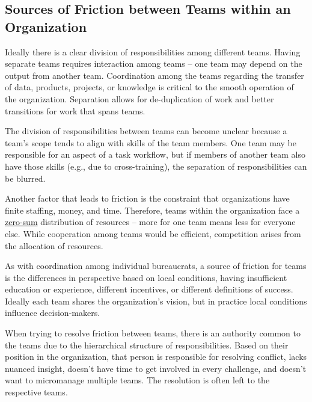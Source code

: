 \subsection*{Sources of Friction between Teams within an Organization}

Ideally there is a clear division of responsibilities among different teams. Having separate teams requires interaction among teams -- one team may depend on the output from another team. Coordination among the teams regarding the transfer of data, products, projects, or knowledge is critical to the smooth operation of the organization. Separation allows for de-duplication of work and better transitions for work that spans teams. 

The division of  responsibilities between teams can become unclear because a team's scope tends to align with skills of the team members. One team may be responsible for an aspect of a task workflow, but if members of another team also have those skills (e.g., due to cross-training), the separation of responsibilities can be blurred. 
 

Another factor that leads to friction is the constraint that organizations have finite staffing, money, and time. Therefore, teams within the organization face a \href{https://en.wikipedia.org/wiki/Zero-sum_game}{zero-sum}
distribution of resources -- more for one team means less for everyone else. While cooperation among teams would be efficient, competition arises from the allocation of resources.

As with coordination among individual bureaucrats, a source of friction for teams is the differences in perspective based on local conditions, having insufficient education or experience, different incentives, or different definitions of success. Ideally each team shares the organization's vision, but in practice local conditions influence decision-makers.

When trying to resolve friction between teams, there is an authority common to the teams due to the hierarchical structure of responsibilities. Based on their position in the organization, that person is responsible for resolving conflict, lacks nuanced insight, doesn't have time to get involved in every challenge, and doesn't want to micromanage multiple teams. The resolution is often left to the respective teams. 


